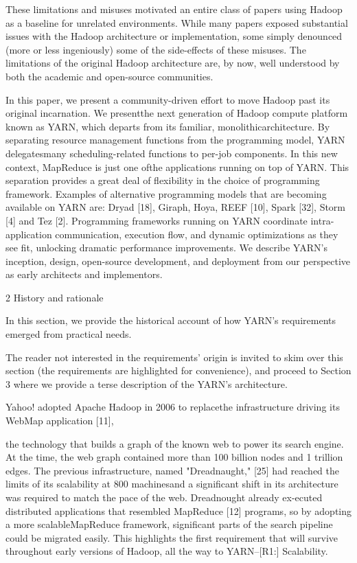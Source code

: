These limitations and misuses motivated an entire class of papers using Hadoop
as a baseline for unrelated environments.
While many papers exposed substantial issues with the Hadoop architecture or
implementation, some simply denounced (more or less ingeniously) some of the
side-effects of these misuses.
The limitations of the original Hadoop architecture are, by now, well
understood by both the academic and open-source communities.

In this paper, we present a community-driven effort to move Hadoop past its
original incarnation. 
We presentthe next generation of Hadoop compute platform known as YARN, which
departs from its familiar, monolithicarchitecture.
By separating resource management functions from the programming model, YARN
delegatesmany scheduling-related functions to per-job components. 
In this new context, MapReduce is just one ofthe applications running on top of
YARN.
This separation provides a great deal of flexibility in the choice of
programming framework. 
Examples of alternative programming models that are becoming available on
YARN are: Dryad [18], Giraph, Hoya, REEF [10], Spark [32], Storm [4] and Tez
[2].
Programming frameworks running on YARN coordinate intra-application
communication, execution flow, and dynamic optimizations as they see fit,
unlocking dramatic performance improvements.
We describe YARN's inception, design, open-source development, and deployment
from our perspective as early architects and implementors.

2 History and rationale

In this section, we provide the historical account of how YARN's requirements
emerged from practical needs.

The reader not interested in the requirements' origin is invited to skim over
this section (the requirements are highlighted for convenience), and proceed to
Section 3 where we provide a terse description of the YARN's architecture.

Yahoo! adopted Apache Hadoop in 2006 to replacethe infrastructure driving its
WebMap application [11],

the technology that builds a graph of the known web to power its search engine.
At the time, the web graph contained more than 100 billion nodes and 1 trillion
edges.
The previous infrastructure, named "Dreadnaught," [25] had reached the limits
of its scalability at 800 machinesand a significant shift in its architecture
was required to match the pace of the web.
Dreadnought already ex-ecuted distributed applications that resembled MapReduce
[12] programs, so by adopting a more scalableMapReduce framework, significant
parts of the search pipeline could be migrated easily.
This highlights the first requirement that will survive throughout early
versions of Hadoop, all the way to YARN--[R1:] Scalability.

